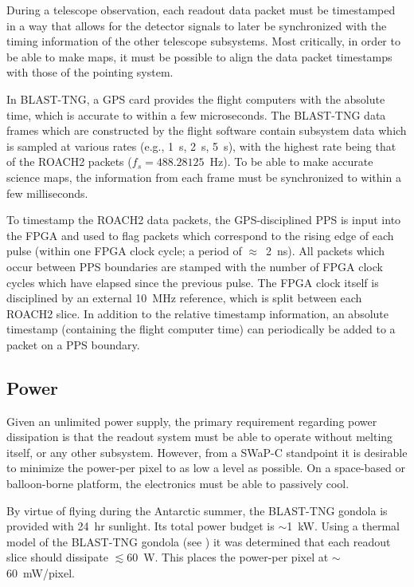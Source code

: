 During a telescope observation, each readout data packet must be timestamped in a way that allows for the detector signals to later be synchronized with the timing information of the other telescope subsystems. Most critically, in order to be able to make maps, it must be possible to align the data packet timestamps with those of the pointing system.

In BLAST-TNG, a GPS card provides the flight computers with the absolute time, which is accurate to within a few microseconds. The BLAST-TNG data frames which are constructed by the flight software contain subsystem data which is sampled at various rates (e.g., 1~s, 2~s, 5~s), with the highest rate being that of the ROACH2 packets ($f_{s} = 488.28125$~Hz). To be able to make accurate science maps, the information from each frame must be synchronized to within a few milliseconds.

To timestamp the ROACH2 data packets, the GPS-disciplined PPS is input into the FPGA and used to flag packets which correspond to the rising edge of each pulse (within one FPGA clock cycle; a period of $\approx$~2~ns). All packets which occur between PPS boundaries are stamped with the number of FPGA clock cycles which have elapsed since the previous pulse. The FPGA clock itself is disciplined by an external 10~MHz reference, which is split between each ROACH2 slice. In addition to the relative timestamp information, an absolute timestamp (containing the flight computer time) can periodically be added to a packet on a PPS boundary.

\subsection{Power}\label{power}

Given an unlimited power supply, the primary requirement regarding power dissipation is that the readout system must be able to operate without melting itself, or any other subsystem. However, from a SWaP-C standpoint it is desirable to minimize the power-per pixel to as low a level as possible. On a space-based or balloon-borne platform, the electronics must be able to passively cool.

By virtue of flying during the Antarctic summer, the BLAST-TNG gondola is provided with 24~hr sunlight. Its total power budget is $\sim$1~kW. Using a thermal model of the BLAST-TNG gondola (see \citet{gordon2016}) it was determined that each readout slice should dissipate $\lesssim{60}$~W. This places the power-per pixel at $\sim$60~mW/pixel.

